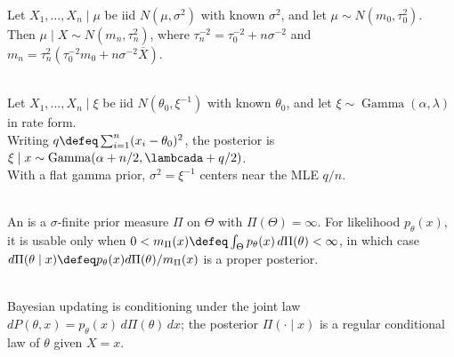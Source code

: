 \begin{example} \label{ex:normal-normal-conjugacy} \\
Let $X_1,\ldots,X_n\mid\mu$ be iid $N(\mu,\sigma^2)$ with known $\sigma^2$, and let $\mu\sim N(m_0,\tau_0^2)$.\\
Then $\mu\mid X\sim N(m_n,\tau_n^2)$, where $\tau_n^{-2}=\tau_0^{-2}+n\sigma^{-2}$ and $m_n=\tau_n^2(\tau_0^{-2}m_0+n\sigma^{-2}\overline{X})$.
\end{example}

\begin{example} \label{ex:normal-precision-gamma-conjugacy} \\
Let $X_1,\ldots,X_n\mid\xi$ be iid $N(\theta_0,\xi^{-1})$ with known $\theta_0$, and let $\xi\sim\operatorname{Gamma}(\alpha,\lambda)$ in rate form.\\
Writing $q\defeq\sum_{i=1}^n(x_i-\theta_0)^2$, the posterior is $\xi\mid x\sim\operatorname{Gamma}(\alpha+n/2,\lambcada+q/2)$.\\
With a flat gamma prior, $\sigma^2=\xi^{-1}$ centers near the MLE $q/n$.
\end{example}

\begin{definition} \label{rem:improper-priors-need-proper-posteriors} \\
An  is a $\sigma$-finite prior measure $\Pi$ on $\Theta$ with $\Pi(\Theta)=\infty$.
For likelihood $p_\theta(x)$, it is usable only when $0<m_\Pi(x)\defeq\int_\Theta p_\theta(x)\,d\Pi(\theta)<\infty$, in which case $d\Pi(\theta\mid x)\defeq p_\theta(x)d\Pi(\theta)/m_\Pi(x)$ is a proper posterior.
\end{definition}

\begin{remark} \label{rem:bayesian-conditioning-measure-theory} \\
Bayesian updating is conditioning under the joint law $dP(\theta,x)=p_\theta(x)\,d\Pi(\theta)\,dx$; the posterior $\Pi(\cdot\mid x)$ is a regular conditional law of $\theta$ given $X=x$.
\end{remark}
